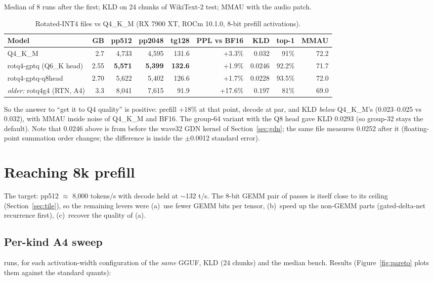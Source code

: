 \documentclass[10pt,a4paper]{article}
\newcommand{\tx}[1]{\texttt{\detokenize{#1}}}
\begin{document}
Median of 8 runs after the first; KLD on 24 chunks of WikiText-2 test; MMAU with the audio patch.

\begin{table}[H]
\centering\small
\caption{Rotated-INT4 files vs Q4\_K\_M (RX 7900 XT, ROCm 10.1.0, 8-bit prefill activations).}
\begin{tabular}{@{}lrrrrrrrr@{}}
\toprule
Model & GB & pp512 & pp2048 & tg128 & PPL vs BF16 & KLD & top-1 & MMAU\\
\midrule
Q4\_K\_M & 2.7 & 4{,}733 & 4{,}595 & 131.6 & +3.3\% & 0.032 & 91\% & 72.2\\
rotq4-gptq (Q6\_K head) & 2.55 & \textbf{5{,}571} & \textbf{5{,}399} & \textbf{132.6} & +1.9\% & 0.0246 & 92.2\% & 71.7\\
rotq4-gptq-q8head & 2.70 & 5{,}622 & 5{,}402 & 126.6 & +1.7\% & 0.0228 & 93.5\% & 72.0\\
\emph{older:} rotq4g4 (RTN, A4) & 3.3 & 8{,}041 & 7{,}615 & 91.9 & +17.6\% & 0.197 & 81\% & 69.0\\
\bottomrule
\end{tabular}
\end{table}
So the answer to ``get it to Q4 quality'' is positive: prefill $+18\%$ at that point, decode at par, and KLD \emph{below}
Q4\_K\_M's (0.023--0.025 vs 0.032), with MMAU inside noise of Q4\_K\_M and BF16.
The group-64 variant with the Q8 head gave KLD 0.0293 (so group-32 stays the default).
Note that 0.0246 above is from before the wave32 GDN kernel of Section~\ref{sec:gdn}; the same file measures 0.0252 after it
(floating-point summation order changes; the difference is inside the $\pm$0.0012 standard error).

\section{Reaching 8k prefill}
\label{sec:8k}

The target: pp512 $\approx$ 8{,}000 tokens/s with decode held at $\sim$132 t/s. The 8-bit GEMM pair of passes is itself
close to its ceiling (Section~\ref{sec:tile}), so the remaining levers were (a)~use fewer GEMM bits per tensor, (b)~speed up
the non-GEMM parts (gated-delta-net recurrence first), (c)~recover the quality of (a).

\subsection{Per-kind A4 sweep}
\tx{scripts/sweep_a4.sh} runs, for each activation-width configuration of the \emph{same} GGUF, KLD (24 chunks) and
the median bench. Results (Figure~\ref{fig:pareto} plots them against the standard quants):
\end{document}
